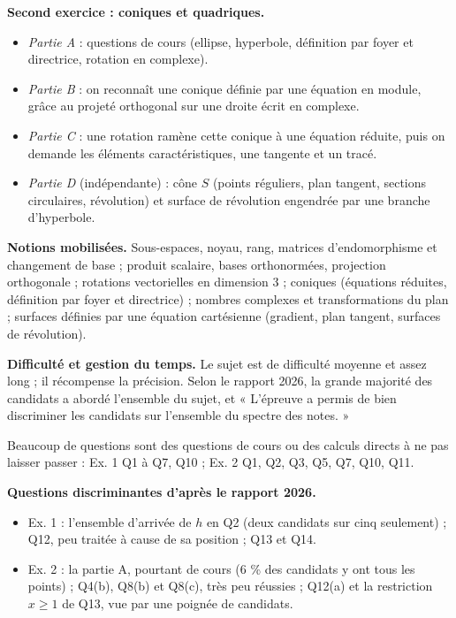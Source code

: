 \documentclass[11pt,a4paper]{article}
\providecommand{\tightlist}{\setlength{\itemsep}{0pt}\setlength{\parskip}{0pt}}
\begin{document}
\textbf{Second exercice : coniques et quadriques.}

\begin{itemize}
\tightlist
\item
  \emph{Partie A} : questions de cours (ellipse, hyperbole, définition par foyer et directrice, rotation en complexe).
\item
  \emph{Partie B} : on reconnaît une conique définie par une équation en module, grâce au projeté orthogonal sur une droite écrit en complexe.
\item
  \emph{Partie C} : une rotation ramène cette conique à une équation réduite, puis on demande les éléments caractéristiques, une tangente et un tracé.
\item
  \emph{Partie D} (indépendante) : cône \(S\) (points réguliers, plan tangent, sections circulaires, révolution) et surface de révolution engendrée par une branche d'hyperbole.
\end{itemize}

\textbf{Notions mobilisées.} Sous-espaces, noyau, rang, matrices d'endomorphisme et changement de base ; produit scalaire, bases orthonormées, projection orthogonale ; rotations vectorielles en dimension 3 ; coniques (équations réduites, définition par foyer et directrice) ; nombres complexes et transformations du plan ; surfaces définies par une équation cartésienne (gradient, plan tangent, surfaces de révolution).

\textbf{Difficulté et gestion du temps.} Le sujet est de difficulté moyenne et assez long ; il récompense la précision. Selon le rapport 2026, la grande majorité des candidats a abordé l'ensemble du sujet, et « L'épreuve a permis de bien discriminer les candidats sur l'ensemble du spectre des notes. »

Beaucoup de questions sont des questions de cours ou des calculs directs à ne pas laisser passer : Ex. 1 Q1 à Q7, Q10 ; Ex. 2 Q1, Q2, Q3, Q5, Q7, Q10, Q11.

\textbf{Questions discriminantes d'après le rapport 2026.}

\begin{itemize}
\tightlist
\item
  Ex. 1 : l'ensemble d'arrivée de \(h\) en Q2 (deux candidats sur cinq seulement) ; Q12, peu traitée à cause de sa position ; Q13 et Q14.
\item
  Ex. 2 : la partie A, pourtant de cours (6 \% des candidats y ont tous les points) ; Q4(b), Q8(b) et Q8(c), très peu réussies ; Q12(a) et la restriction \(x\geqslant1\) de Q13, vue par une poignée de candidats.
\end{itemize}
\end{document}
